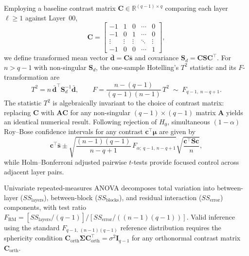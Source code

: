 \documentclass[12pt, a4paper, oneside]{report}
\theoremstyle{definition}
\newcommand{\vect}[1]{\mathbf{#1}}
\newcommand{\mat}[1]{\mathbf{#1}}
\newcommand{\R}{\mathbb{R}}
\begin{document}
Employing a baseline contrast matrix $\mat{C} \in \R^{(q-1) \times q}$ comparing each layer $\ell \ge 1$ against Layer~00,
\begin{equation}
    \mat{C} =
    \begin{bmatrix}
        -1 & 1 & 0 & \cdots & 0 \\
        -1 & 0 & 1 & \cdots & 0 \\
        \vdots & \vdots & \vdots & \ddots & \vdots \\
        -1 & 0 & 0 & \cdots & 1
    \end{bmatrix},
    \label{eq:contrast_matrix}
\end{equation}
we define transformed mean vector $\bar{\vect{d}} = \mat{C}\bar{\vect{s}}$ and covariance $\mat{S}_d = \mat{C}\mat{S}\mat{C}^\top$. For $n > q - 1$ with non-singular $\mat{S}_d$, the one-sample Hotelling's $T^2$ statistic and its $F$-transformation are
\begin{equation}
    T^2 = n\,\bar{\vect{d}}^\top \mat{S}_d^{-1} \bar{\vect{d}},
    \qquad
    F = \frac{n - (q - 1)}{(q - 1)(n - 1)}\,T^2 \;\sim\; F_{q-1,\; n - q + 1}.
    \label{eq:hotelling_t2_profile}
\end{equation}
The statistic $T^2$ is algebraically invariant to the choice of contrast matrix: replacing $\mat{C}$ with $\mat{A}\mat{C}$ for any non-singular $(q-1) \times (q-1)$ matrix $\mat{A}$ yields an identical numerical result. Following rejection of $H_0$, simultaneous $(1 - \alpha)$ Roy--Bose confidence intervals for any contrast $\vect{c}^\top \boldsymbol{\mu}$ are given by
\begin{equation}
    \vect{c}^\top \bar{\vect{s}} \pm \sqrt{\frac{(n - 1)(q - 1)}{n - q + 1}\,F_{\alpha;\; q-1,\, n-q+1}} \sqrt{\frac{\vect{c}^\top \mat{S} \vect{c}}{n}},
    \label{eq:roy_bose_ci}
\end{equation}
while Holm--Bonferroni adjusted pairwise $t$-tests provide focused control across adjacent layer pairs.

Univariate repeated-measures ANOVA decomposes total variation into between-layer ($SS_{\text{layers}}$), between-block ($SS_{\text{blocks}}$), and residual interaction ($SS_{\text{error}}$) components, with test ratio $F_{\text{RM}} = [SS_{\text{layers}}/(q-1)] / [SS_{\text{error}}/((n-1)(q-1))]$. Valid inference using the standard $F_{q-1,\,(n-1)(q-1)}$ reference distribution requires the sphericity condition $\mat{C}_{\text{orth}}\mat{\Sigma}\mat{C}_{\text{orth}}^\top = \sigma^2 \mat{I}_{q-1}$ for any orthonormal contrast matrix $\mat{C}_{\text{orth}}$.
\end{document}
